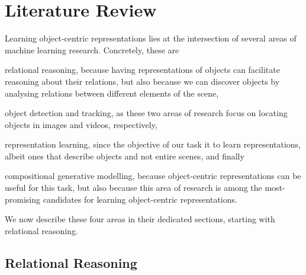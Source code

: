 \chapter{Literature Review}
\label{ch:lit_review}

	Learning object-centric representations lies at the intersection of several areas of machine learning research. 
	Concretely, these are \begin{inparaenum}[(1)\!]
	\item relational reasoning, because having representations of objects can facilitate reasoning about their relations, but also because we can discover objects by analysing relations between different elements of the scene,
	\item object detection and tracking, as these two areas of research focus on locating objects in images and videos, respectively,
	\item representation learning, since the objective of our task it to learn representations, albeit ones that describe objects and not entire scenes, and finally
	\item compositional generative modelling, because object-centric representations can be useful for this task, but also because this area of research is among the most-promising candidates for learning object-centric representations.
	\end{inparaenum}
	We now describe these four areas in their dedicated sections, starting with relational reasoning.


\section{Relational Reasoning}
\label{sec:relational_reasoning}

